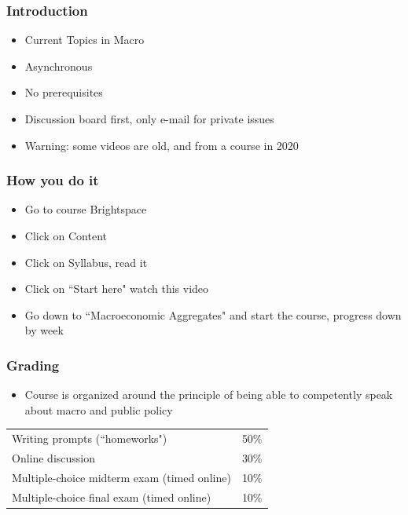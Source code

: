 \documentclass{beamer}
\date{}
\author{Trevor Gallen}
\begin{document}
\renewcommand*{\inserttotalframenumber}{\pageref{lastframe}}

\begin{frame}
\titlepage
\end{frame}


\begin{frame}
\frametitle{Introduction}
\begin{itemize}
\item Current Topics in Macro
\bigskip
\item Asynchronous
\bigskip
\item No prerequisites
\bigskip
\item Discussion board first, only e-mail for private issues
\bigskip
\item Warning: some videos are old, and from a course in 2020
\end{itemize}
\end{frame}

\begin{frame}
\frametitle{How you do it}
\begin{itemize}
\item Go to course Brightspace
\bigskip
\item Click on Content
\bigskip
\item Click on Syllabus, read it
\bigskip
\item Click on ``Start here" watch this video
\bigskip
\item Go down to ``Macroeconomic Aggregates" and start the course, progress down by week
\end{itemize}
\end{frame}


\begin{frame}
\frametitle{Grading}
\begin{itemize}
\item Course is organized around the principle of being able to competently speak about macro and public policy
\end{itemize}
\begin{table}
\centering
\begin{tabular}{ll}
\hline\hline
Writing prompts (``homeworks") & 50\%\\
Online discussion &  30\% \\
Multiple-choice midterm exam (timed online) &  10\%\\ 
Multiple-choice final exam  (timed online) &  10\% \\
\hline\hline
\end{tabular}
\end{table}
\end{frame}
\end{document}
